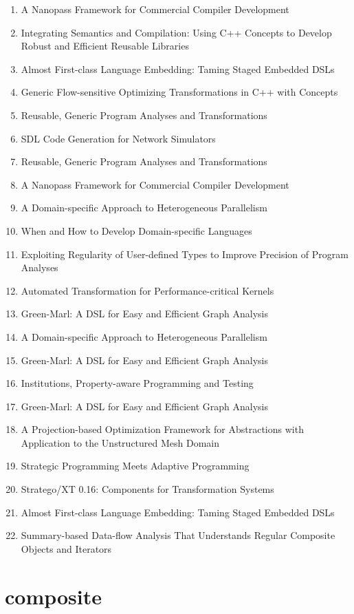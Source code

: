 \begin{enumerate}
\item A Nanopass Framework for Commercial Compiler Development
\item Integrating Semantics and Compilation: Using C++ Concepts to Develop Robust and Efficient Reusable Libraries
\item Almost First-class Language Embedding: Taming Staged Embedded DSLs
\item Generic Flow-sensitive Optimizing Transformations in C++ with Concepts
\item Reusable, Generic Program Analyses and Transformations
\item SDL Code Generation for Network Simulators
\item Reusable, Generic Program Analyses and Transformations
\item A Nanopass Framework for Commercial Compiler Development
\item A Domain-specific Approach to Heterogeneous Parallelism
\item When and How to Develop Domain-specific Languages
\item Exploiting Regularity of User-defined Types to Improve Precision of Program Analyses
\item Automated Transformation for Performance-critical Kernels
\item Green-Marl: A DSL for Easy and Efficient Graph Analysis
\item A Domain-specific Approach to Heterogeneous Parallelism
\item Green-Marl: A DSL for Easy and Efficient Graph Analysis
\item Institutions, Property-aware Programming and Testing
\item Green-Marl: A DSL for Easy and Efficient Graph Analysis
\item A Projection-based Optimization Framework for Abstractions with Application to the Unstructured Mesh Domain
\item Strategic Programming Meets Adaptive Programming
\item Stratego/XT 0.16: Components for Transformation Systems
\item Almost First-class Language Embedding: Taming Staged Embedded DSLs
\item Summary-based Data-flow Analysis That Understands Regular Composite Objects and Iterators
\end{enumerate}

\section{composite}


